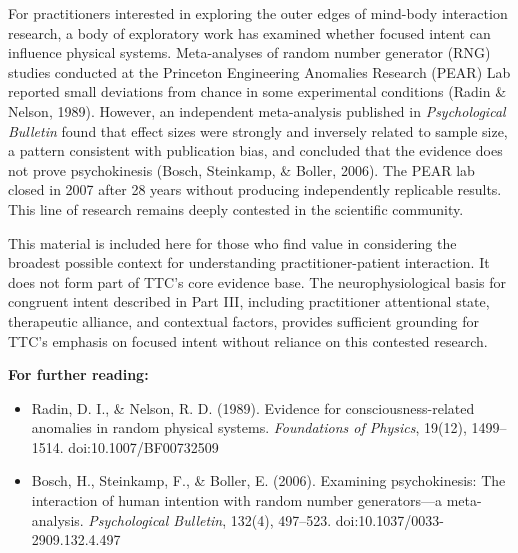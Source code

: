 \documentclass[11pt,letterpaper]{article}
\begin{document}
For practitioners interested in exploring the outer edges of mind-body interaction research, a body of exploratory work has examined whether focused intent can influence physical systems. Meta-analyses of random number generator (RNG) studies conducted at the Princeton Engineering Anomalies Research (PEAR) Lab reported small deviations from chance in some experimental conditions (Radin \& Nelson, 1989). However, an independent meta-analysis published in \textit{Psychological Bulletin} found that effect sizes were strongly and inversely related to sample size, a pattern consistent with publication bias, and concluded that the evidence does not prove psychokinesis (Bosch, Steinkamp, \& Boller, 2006). The PEAR lab closed in 2007 after 28 years without producing independently replicable results. This line of research remains deeply contested in the scientific community.


This material is included here for those who find value in considering the broadest possible context for understanding practitioner-patient interaction. It does not form part of TTC's core evidence base. The neurophysiological basis for congruent intent described in Part III, including practitioner attentional state, therapeutic alliance, and contextual factors, provides sufficient grounding for TTC's emphasis on focused intent without reliance on this contested research.


\textbf{For further reading:}


\begin{itemize}
\item Radin, D. I., \& Nelson, R. D. (1989). Evidence for consciousness-related anomalies in random physical systems. \textit{Foundations of Physics}, 19(12), 1499–1514. doi:10.1007/BF00732509
\item Bosch, H., Steinkamp, F., \& Boller, E. (2006). Examining psychokinesis: The interaction of human intention with random number generators—a meta-analysis. \textit{Psychological Bulletin}, 132(4), 497–523. doi:10.1037/0033-2909.132.4.497
\end{itemize}
\end{document}
